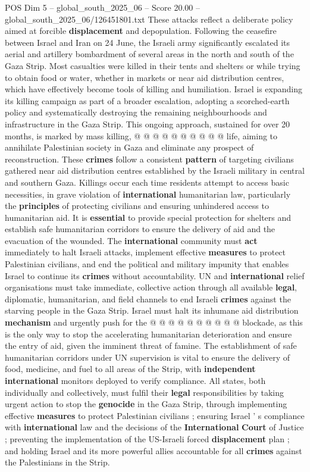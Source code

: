 \begin{textsample}{POS Dim 5 – global\_south\_2025\_06 – Score 20.00 – global\_south\_2025\_06/126451801.txt}
These attacks reflect a deliberate policy aimed at forcible \textbf{displacement} and depopulation.
Following the ceasefire between Israel and Iran on 24 June, the Israeli army significantly escalated its aerial and artillery bombardment of several areas in the north and south of the Gaza Strip.
Most casualties were killed in their tents and shelters or while trying to obtain food or water, whether in markets or near aid distribution centres, which have effectively become tools of killing and humiliation.
Israel is expanding its killing campaign as part of a broader escalation, adopting a scorched-earth policy and systematically destroying the remaining neighbourhoods and infrastructure in the Gaza Strip.
This ongoing approach, sustained for over 20 months, is marked by mass killing, @ @ @ @ @ @ @ @ @ @ life, aiming to annihilate Palestinian society in Gaza and eliminate any prospect of reconstruction.
These \textbf{crimes} follow a consistent \textbf{pattern} of targeting civilians gathered near aid distribution centres established by the Israeli military in central and southern Gaza.
Killings occur each time residents attempt to access basic necessities, in grave violation of \textbf{international} humanitarian law, particularly the \textbf{principles} of protecting civilians and ensuring unhindered access to humanitarian aid.
It is \textbf{essential} to provide special protection for shelters and establish safe humanitarian corridors to ensure the delivery of aid and the evacuation of the wounded.
The \textbf{international} community must \textbf{act} immediately to halt Israeli attacks, implement effective \textbf{measures} to protect Palestinian civilians, and end the political and military impunity that enables Israel to continue its \textbf{crimes} without accountability.
UN and \textbf{international} relief organisations must take immediate, collective action through all available \textbf{legal}, diplomatic, humanitarian, and field channels to end Israeli \textbf{crimes} against the starving people in the Gaza Strip.
Israel must halt its inhumane aid distribution \textbf{mechanism} and urgently push for the @ @ @ @ @ @ @ @ @ @ blockade, as this is the only way to stop the accelerating humanitarian deterioration and ensure the entry of aid, given the imminent threat of famine.
The establishment of safe humanitarian corridors under UN supervision is vital to ensure the delivery of food, medicine, and fuel to all areas of the Strip, with \textbf{independent} \textbf{international} monitors deployed to verify compliance.
All states, both individually and collectively, must fulfil their \textbf{legal} responsibilities by taking urgent action to stop the \textbf{genocide} in the Gaza Strip, through implementing effective \textbf{measures} to protect Palestinian civilians ; ensuring Israel ' s compliance with \textbf{international} law and the decisions of the \textbf{International} \textbf{Court} of Justice ; preventing the implementation of the US-Israeli forced \textbf{displacement} plan ; and holding Israel and its more powerful allies accountable for all \textbf{crimes} against the Palestinians in the Strip.

\end{textsample}
